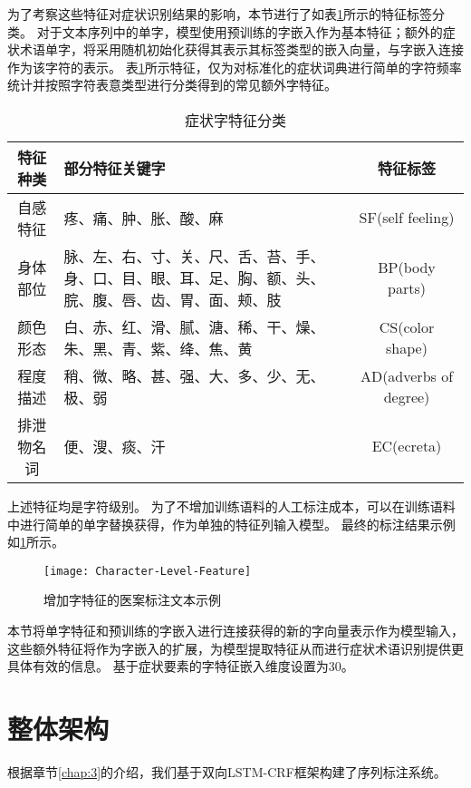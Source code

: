 为了考察这些特征对症状识别结果的影响，本节进行了如表\ref{tab:symptom_cluster}所示的特征标签分类。
对于文本序列中的单字，模型使用预训练的字嵌入作为基本特征；额外的症状术语单字，将采用随机初始化获得其表示其标签类型的嵌入向量，与字嵌入连接作为该字符的表示。
表\ref{tab:symptom_cluster}所示特征，仅为对标准化的症状词典进行简单的字符频率统计并按照字符表意类型进行分类得到的常见额外字特征。
\begin{table}[H]
    \centering
    \footnotesize
    \setlength{\tabcolsep}{4pt}
    \renewcommand{\arraystretch}{1.2}
    \caption{症状字特征分类}
    \begin{tabular}{cp{5cm}c}
        \toprule
        特征种类 & 部分特征关键字 & 特征标签\\
        \midrule
        自感特征 & 疼、痛、肿、胀、酸、麻 & SF(self feeling)\\
        \midrule
        身体部位 & 脉、左、右、寸、关、尺、舌、苔、手、身、口、目、眼、耳、足、胸、额、头、脘、腹、唇、齿、胃、面、颊、肢 & BP(body parts)\\
        \midrule
        颜色形态 & 白、赤、红、滑、腻、溏、稀、干、燥、朱、黑、青、紫、绛、焦、黄 & CS(color shape)\\
        \midrule
        程度描述 & 稍、微、略、甚、强、大、多、少、无、极、弱 & AD(adverbs of degree) \\
        \midrule
        排泄物名词 & 便、溲、痰、汗 & EC(ecreta)\\
        \bottomrule
    \end{tabular}
    \label{tab:symptom_cluster}
\end{table}

上述特征均是字符级别。
为了不增加训练语料的人工标注成本，可以在训练语料中进行简单的单字替换获得，作为单独的特征列输入模型。
最终的标注结果示例如\ref{fig:character_level_feature}所示。
\begin{figure}[H]
    \centering
    \texttt{[image: Character-Level-Feature]}
    \caption{增加字特征的医案标注文本示例}
    \label{fig:character_level_feature}
\end{figure}

本节将单字特征和预训练的字嵌入进行连接获得的新的字向量表示作为模型输入，这些额外特征将作为字嵌入的扩展，为模型提取特征从而进行症状术语识别提供更具体有效的信息。
基于症状要素的字特征嵌入维度设置为30。

\section{整体架构}
根据章节\ref{chap:3}的介绍，我们基于双向LSTM-CRF框架构建了序列标注系统。

